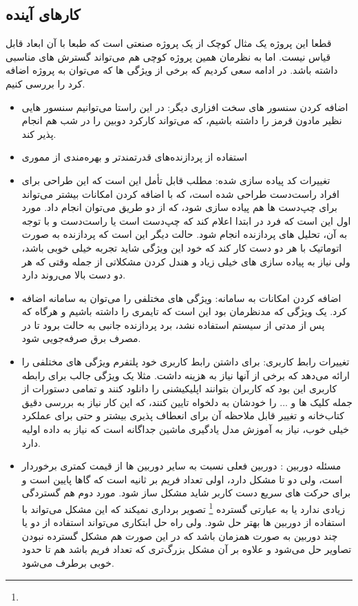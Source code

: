 \documentclass{article}
\begin{document}
\subsection{کارهای آینده}
قطعا این پروژه یک مثال کوچک از یک پروژه صنعتی است که طبعا با آن ابعاد قابل قیاس نیست. اما به نظرمان همین پروژه کوچی هم می‌تواند گسترش های مناسبی داشته باشد. در ادامه سعی کردیم که برخی از ويژگی ها که می‌توان به پروژه اضافه کرد را بررسی کنیم.

\begin{itemize}
	\item اضافه کردن سنسور های سخت افزاری دیگر: در این راستا می‌توانیم سنسور هایی نظیر مادون قرمز را داشته باشیم، که می‌تواند کارکرد دوبین را در شب هم انجام پذیر کند.
	
	\item استفاده از پردازنده‌های قدرتمند‌تر و بهره‌مندی از مموری 
	
	\item تغییرات کد پیاده سازی شده: مطلب قابل تأمل این است که این طراحی برای افراد راست‌دست طراحی شده است، که با اضافه کردن امکانات بیشتر می‌تواند برای چپ‌دست ها هم پیاده سازی شود، که از دو طریق می‌توان انجام داد. مورد اول این است که فرد در ابتدا اعلام کند که چپ‌دست است یا راست‌دست و با توجه به آن، تحلیل های پردازنده انجام شود. حالت دیگر این است که پردازنده به صورت اتوماتیک با هر دو دست کار کند که خود این ویژگی شاید تجربه خیلی خوبی باشد، ولی نیاز به پیاده سازی های خیلی زیاد و هندل کردن مشکلاتی از جمله وقتی که هر دو دست بالا می‌روند دارد.
	
	\item اضافه کردن امکانات به سامانه: ویژگی های مختلفی را می‌توان به سامانه اضافه کرد. یک ويژگی که مدنظرمان بود این است که تایمری را داشته باشیم و هرگاه که پس از مدتی از سیستم استفاده نشد، برد پردازنده جانبی به حالت  برود تا در مصرف برق صرفه‌جویی شود.
	
	\item تغییرات رابط کاربری: برای داشتن رابط کاربری خود پلتفرم ویژگی های مختلفی را ارائه می‌دهد که برخی از آنها نیاز به هزینه داشت. مثلا یک ويژگی جالب برای رابطه کاربری این بود که کاربران بتوانند اپلیکیشنی را دانلود کنند و تمامی دستورات از جمله کلیک ها و ... را خودشان به دلخواه تایین کنند، که این کار نیاز به بررسی دقیق کتاب‌خانه  و تغییر قابل ملاحظه آن برای انعطاف پذیری بیشتر و حتی برای عملکرد خیلی خوب، نیاز به آموزش مدل یادگیری ماشین جداگانه است که نیاز به داده اولیه دارد.
	
	\item مسئله دوربین : دوربین فعلی نسبت به سایر دوربین ها از قیمت کمتری برخوردار است، ولی دو تا مشکل دارد، اولی تعداد فریم بر ثانیه است که گاها پایین است و برای حرکت های سریع دست کاربر شاید مشکل ساز شود. مورد دوم هم گستردگی زیادی ندارد یا به عبارتی گسترده \footnote{} تصویر برداری نمیکند که این مشکل می‌تواند با استفاده از دوربین ها بهتر حل شود. ولی راه حل ابتکاری می‌تواند استفاده از دو یا چند دوربین به صورت همزمان باشد که در این صورت هم مشکل گسترده نبودن تصاویر حل می‌شود و علاوه بر آن مشکل بزرگ‌تری که تعداد فریم باشد هم تا حدود خوبی برطرف می‌شود.
\end{itemize}
\end{document}
